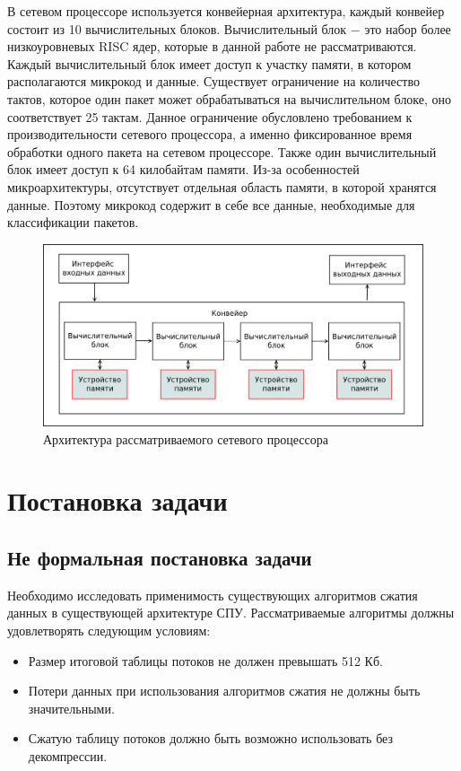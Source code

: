 \documentclass[a4paper, 12pt, titlepage, finall]{extreport}
\begin{document}
        В сетевом процессоре используется конвейерная архитектура, каждый конвейер состоит из 10 вычислительных блоков. 
        Вычислительный блок $-$ это набор более низкоуровневых RISC ядер, которые в данной работе не рассматриваются. 
        Каждый вычислительный блок имеет доступ к участку памяти, в котором располагаются микрокод и данные.
        Существует ограничение на количество тактов, которое один пакет может обрабатываться на вычислительном блоке, оно соответствует 25 тактам.
        Данное ограничение обусловлено требованием к производительности сетевого процессора, а именно фиксированное время обработки одного пакета на сетевом процессоре.
        Также один вычислительный блок имеет доступ к 64 килобайтам памяти.
        Из-за особенностей микроархитектуры, отсутствует отдельная область памяти, в которой хранятся данные. Поэтому микрокод содержит в себе все данные,
        необходимые для классификации пакетов.

        \begin{figure}[h]
            \includegraphics[width=\textwidth]{npu_all.png}
            \caption{Архитектура рассматриваемого сетевого процессора}
        \end{figure}
        
    \chapter{Постановка задачи}
    \section{Не формальная постановка задачи}
        Необходимо исследовать применимость существующих алгоритмов сжатия данных в существующей архитектуре СПУ.
        Рассматриваемые алгоритмы должны удовлетворять следующим условиям:
        \begin{itemize}
            \item Размер итоговой таблицы потоков не должен превышать 512 Кб.
            \item Потери данных при использования алгоритмов сжатия не должны быть значительными.
            \item Сжатую таблицу потоков должно быть возможно использовать без декомпрессии.
        \end{itemize}
\end{document}
